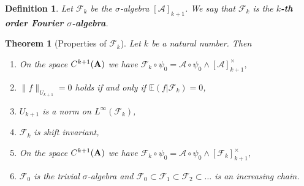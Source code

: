 \documentclass [11pt] {article}
\newtheorem{theorem}{Theorem}
\newtheorem{definition}{Definition}[section]
\def\bA{{\bf A}}
\begin{document}
\begin{definition}  Let $\mathcal{F}_k$ be the $\sigma$-algebra $[\mathcal{A}]_{k+1}$. We say that $\mathcal{F}_k$ is the {\bf $k$-th order Fourier $\sigma$-algebra}. 
\end{definition}

\begin{theorem}[Properties of $\mathcal{F}_k$]\label{propfk} Let $k$ be a natural number. Then
\begin{enumerate}
\item On the space $C^{k+1}(\bA)$ we have
$\mathcal{F}_k\circ\psi_0=\mathcal{A}\circ\psi_0\wedge [\mathcal{A}]_{k+1}^\times,$
\item $\|f\|_{U_{k+1}}=0$ holds if and only if $\mathbb{E}(f|\mathcal{F}_k)=0$,
\item $U_{k+1}$ is a norm on $L^\infty(\mathcal{F}_k)$,
\item $\mathcal{F}_k$ is shift invariant,
\item On the space $C^{k+1}(\bA)$ we have
$\mathcal{F}_k\circ\psi_0=\mathcal{A}\circ\psi_0\wedge [\mathcal{F}_k]_{k+1}^\times,$
\item $\mathcal{F}_0$ is the trivial $\sigma$-algebra and $\mathcal{F}_0\subset\mathcal{F}_1\subset\mathcal{F}_2\subset\dots$ is an increasing chain.
\end{enumerate}
\end{theorem}
\end{document}
